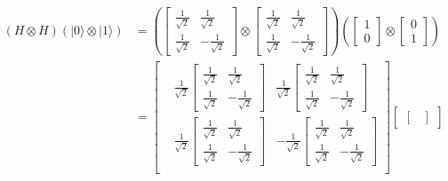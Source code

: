 \documentclass{article}
\begin{document}
\begin{equation}
\begin{split}
    (H \otimes H)(|0\rangle \otimes |1\rangle) & = (
        \begin{bmatrix}
            \frac{1}{\sqrt{2}} & \frac{1}{\sqrt{2}} \\
            \frac{1}{\sqrt{2}} & -\frac{1}{\sqrt{2}}
        \end{bmatrix} \otimes \begin{bmatrix}
            \frac{1}{\sqrt{2}} & \frac{1}{\sqrt{2}} \\
            \frac{1}{\sqrt{2}} & -\frac{1}{\sqrt{2}}
        \end{bmatrix}
    ) (
        \begin{bmatrix}
            1 \\
            0
        \end{bmatrix} \otimes \begin{bmatrix}
            0 \\
            1
        \end{bmatrix}
    ) \\
    & = \begin{bmatrix}
        & \frac{1}{\sqrt{2}}\begin{bmatrix}
            \frac{1}{\sqrt{2}} & \frac{1}{\sqrt{2}} \\
            \frac{1}{\sqrt{2}} & -\frac{1}{\sqrt{2}}
        \end{bmatrix} & \frac{1}{\sqrt{2}}\begin{bmatrix}
            \frac{1}{\sqrt{2}} & \frac{1}{\sqrt{2}} \\
            \frac{1}{\sqrt{2}} & -\frac{1}{\sqrt{2}}
        \end{bmatrix} \\
        & \frac{1}{\sqrt{2}}\begin{bmatrix}
            \frac{1}{\sqrt{2}} & \frac{1}{\sqrt{2}} \\
            \frac{1}{\sqrt{2}} & -\frac{1}{\sqrt{2}}
        \end{bmatrix} & -\frac{1}{\sqrt{2}}\begin{bmatrix}
            \frac{1}{\sqrt{2}} & \frac{1}{\sqrt{2}} \\
            \frac{1}{\sqrt{2}} & -\frac{1}{\sqrt{2}}
        \end{bmatrix} \\
    \end{bmatrix}\begin{bmatrix}
        \begin{bmatrix}

\end{bmatrix}
\end{bmatrix}
\end{split}
\end{equation}
\end{document}
